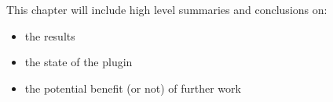 This chapter will include high level summaries and conclusions on:

\begin{itemize}
	\item the results
	\item the state of the plugin
	\item the potential benefit (or not) of further work
\end{itemize}
